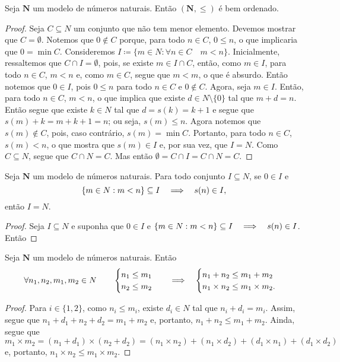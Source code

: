 \begin{teo}
	Seja  $\bm N$ um modelo de números naturais. Então $(\bm N,\leq)$ é bem ordenado.
\end{teo}
\begin{proof}
	Seja $C \subseteq N$ um conjunto que não tem menor elemento. Devemos mostrar que $C=\emptyset$. Notemos que $0 \notin C$ porque, para todo $n \in C$, $0 \leq n$, o que implicaria que $0=\min C$. Consideremos $I \coloneqq \{m \in N:\forall n \in C \quad m < n\}$. Inicialmente, ressaltemos que $C \cap I=\emptyset$, pois, se existe $m \in I \cap C$, então, como $m \in I$, para todo $n \in C$, $m < n$ e, como $m \in C$, segue que $m<m$, o que é absurdo. Então notemos que $0 \in I$, pois $0 \leq n$ para todo $n \in C$ e $0 \notin C$. Agora, seja $m \in I$. Então, para todo $n \in C$, $m<n$, o que implica que existe $d \in N\setminus\{0\}$ tal que $m+d=n$. Então segue que existe $k \in N$ tal que $d=s(k)=k+1$ e segue que $s(m)+k=m+k+1=n$; ou seja, $s(m) \leq n$. Agora notemos que $s(m) \notin C$, pois, caso contrário, $s(m)=\min C$. Portanto, para todo $n \in C$, $s(m)<n$, o que mostra que $s(m) \in I$ e, por sua vez, que $I=N$. Como $C \subseteq N$, segue que $C \cap N=C$. Mas então $\emptyset=C \cap I=C \cap N=C$.
\end{proof}

\begin{teo}
	Seja $\bm N$ um modelo de números naturais. Para todo conjunto $I \subseteq N$, se $0 \in I$ e
	\begin{equation*}
	\{m \in N:m<n\} \subseteq I \quad \Longrightarrow \quad s(n) \in I,
	\end{equation*}
então $I=N$.
\end{teo}
\begin{proof}
	Seja $I \subseteq N$ e suponha que $0 \in I$ e $\{m \in N:m<n\} \subseteq I \quad \Longrightarrow \quad s(n) \in I$. Então
\end{proof}


\begin{lema}
	Seja $\bm N$ um modelo de números naturais. Então
	\begin{equation*}
	\forall n_1,n_2,m_1,m_2 \in N \qquad
	\begin{cases}	
	n_1 \leq m_1 \\
	n_2 \leq m_2 
	\end{cases}
	\quad \Longrightarrow \quad 
	\begin{cases}
	n_1+n_2 \leq m_1+m_2 \\
	n_1 \times n_2 \leq m_1 \times m_2.
	\end{cases}
	\end{equation*}
\end{lema}
\begin{proof} Para $i \in\{1,2\}$, como $n_i \leq m_i$, existe $d_i \in N$ tal que $n_i+d_i=m_i$. Assim, segue que $n_1+d_1+n_2+d_2=m_1+m_2$ e, portanto, $n_1+n_2 \leq m_1+m_2$. Ainda, segue que
	\begin{equation*}
	m_1 \times m_2 = (n_1+d_1) \times (n_2+d_2) = (n_1 \times n_2) + (n_1 \times d_2) + (d_1 \times n_1) + (d_1 \times d_2)
	\end{equation*}
e, portanto, $n_1 \times n_2 \leq m_1 \times m_2$.
\end{proof}

